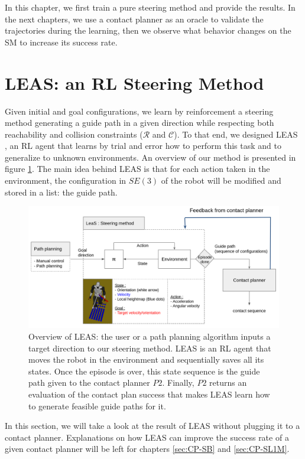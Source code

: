 In this chapter, we first train a pure steering method and provide the results. 
In the next chapters, we use a contact planner as an oracle to validate the trajectories during the learning, then we observe what behavior changes on the SM to increase its success rate.


\section{LEAS: an RL Steering Method\label{subsec:leas-RL}}
Given initial and goal configurations, we learn by reinforcement a steering method generating a guide path in a given direction while respecting both reachability and collision constraints ($\mathcal{R}$ and $\mathcal{C}$). 
To that end, we designed LEAS \cite{LEAS}, an RL agent that learns by trial and error how to perform this task and to generalize to unknown environments. An overview of our method is presented in figure \ref{fig:LEAS}. The main idea behind LEAS is that for each action taken in the environment, the configuration in $SE(3)$ of the robot will be modified and stored in a list: the guide path.

\begin{figure}
    \centering
    \includegraphics[width=\textwidth]{Figures/Chapter_LEAS/leas_overview.png}
    \caption{Overview of LEAS: the user or a path planning algorithm inputs a target direction to our steering method. LEAS is an RL agent that moves the robot in the environment and sequentially saves all its states. Once the episode is over, this state sequence is the guide path given to the contact planner $P2$. Finally, $P2$ returns an evaluation of the contact plan success that makes LEAS learn how to generate feasible guide paths for it.}
    \label{fig:LEAS}
\end{figure}

In this section, we will take a look at the result of LEAS without plugging it to a contact planner.
Explanations on how LEAS can improve the success rate of a given contact planner will be left for chapters \ref{sec:CP-SB} and \ref{sec:CP-SL1M}.

